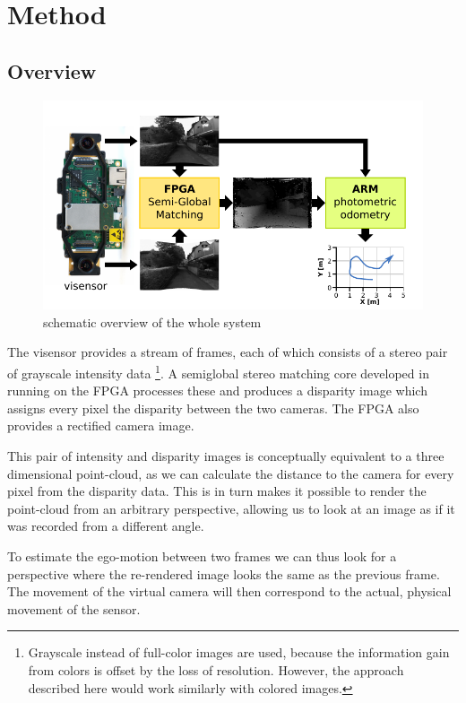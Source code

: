 \chapter{Method}
\label{sec:method}



\section{Overview}

\begin{figure}[h]
    \centering
    \includegraphics[width=\textwidth]{images/system_overview.pdf}
    \caption{schematic overview of the whole system}
    \label{fig:overview}
\end{figure}


The visensor provides a stream of frames, each of which consists of a stereo
pair of grayscale intensity data \footnote{Grayscale instead of full-color
images are used, because the information gain from colors is offset by the loss
of resolution. However, the approach described here would work similarly
with colored images.}.  A semiglobal stereo matching core developed in
\cite{honegger2014sgmcore} running on the FPGA processes these and produces a
disparity image which assigns every pixel the disparity between the two
cameras. The FPGA also provides a rectified camera image.

This pair of intensity and disparity images is conceptually equivalent to a
three dimensional point-cloud, as we can calculate the distance to the camera
for every pixel from the disparity data. This is in turn makes it possible to
render the point-cloud from an arbitrary perspective, allowing us to look at an
image as if it was recorded from a different angle.

To estimate the ego-motion between two frames we can thus look for a
perspective where the re-rendered image looks the same as the previous frame.
The movement of the virtual camera will then correspond to the actual, physical
movement of the sensor.


